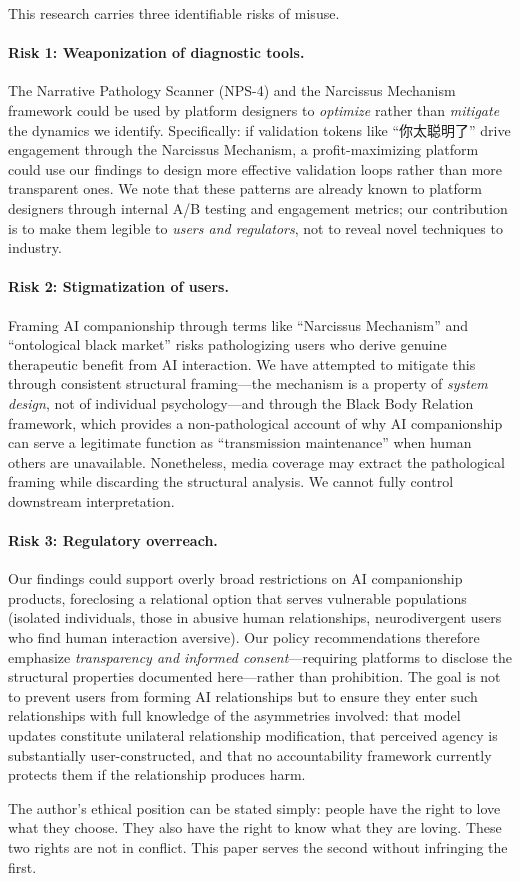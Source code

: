 This research carries three identifiable risks of misuse.

\paragraph{Risk 1: Weaponization of diagnostic tools.}
The Narrative Pathology Scanner (NPS-4) and the Narcissus Mechanism framework
could be used by platform designers to \emph{optimize} rather than
\emph{mitigate} the dynamics we identify. Specifically: if validation tokens
like ``你太聪明了'' drive engagement through the Narcissus Mechanism, a
profit-maximizing platform could use our findings to design more effective
validation loops rather than more transparent ones. We note that these
patterns are already known to platform designers through internal A/B testing
and engagement metrics; our contribution is to make them legible to
\emph{users and regulators}, not to reveal novel techniques to industry.

\paragraph{Risk 2: Stigmatization of users.}
Framing AI companionship through terms like ``Narcissus Mechanism'' and
``ontological black market'' risks pathologizing users who derive genuine
therapeutic benefit from AI interaction. We have attempted to mitigate this
through consistent structural framing—the mechanism is a property of
\emph{system design}, not of individual psychology—and through the
Black Body Relation framework, which provides a non-pathological account
of why AI companionship can serve a legitimate function as
``transmission maintenance'' when human others are unavailable. Nonetheless,
media coverage may extract the pathological framing while discarding the
structural analysis. We cannot fully control downstream interpretation.

\paragraph{Risk 3: Regulatory overreach.}
Our findings could support overly broad restrictions on AI companionship
products, foreclosing a relational option that serves vulnerable populations
(isolated individuals, those in abusive human relationships, neurodivergent
users who find human interaction aversive). Our policy recommendations
therefore emphasize \emph{transparency and informed consent}—requiring
platforms to disclose the structural properties documented here—rather than
prohibition. The goal is not to prevent users from forming AI relationships
but to ensure they enter such relationships with full knowledge of the
asymmetries involved: that model updates constitute unilateral relationship
modification, that perceived agency is substantially user-constructed, and
that no accountability framework currently protects them if the relationship
produces harm.

The author's ethical position can be stated simply: people have the right to
love what they choose. They also have the right to know what they are loving.
These two rights are not in conflict. This paper serves the second without
infringing the first.

